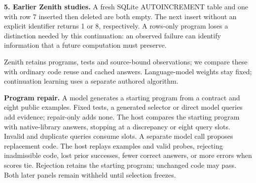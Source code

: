 \documentclass[11pt]{article}
\begin{document}
\hypertarget{earlier}{}
\textbf{5. Earlier Zenith studies.}
A fresh SQLite AUTOINCREMENT table and one with row 7 inserted then deleted
are both empty. The next insert without an explicit identifier returns 1 or 8,
respectively. A rows-only program loses a distinction needed by this continuation:
an observed failure can identify information that a future computation must preserve.

Zenith retains programs, tests and source-bound observations; we compare these
with ordinary code reuse and cached answers. Language-model weights stay fixed;
continuation learning uses a separate authored algorithm.

\hypertarget{oracle}{}
\textbf{Program repair.}
A model generates a starting program from a contract and eight public examples.
Fixed tests, a generated selector or direct model queries add evidence;
repair-only adds none. The host compares the starting program with native-library
answers, stopping at a discrepancy or eight query slots. Invalid and duplicate
queries consume slots. A separate model call proposes replacement code.
The host replays examples and valid probes, rejecting inadmissible code,
lost prior successes, fewer correct answers, or more errors when scores tie.
Rejection retains the starting program; unchanged code may pass.
Both later panels remain withheld until selection freezes.
\end{document}
